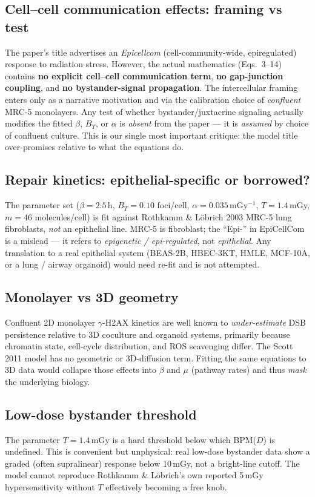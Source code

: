 \documentclass[11pt]{article}
\begin{document}
\subsection{Cell--cell communication effects: framing vs test}
The paper's title advertises an \emph{Epicellcom} (cell-community-wide,
epiregulated) response to radiation stress. However, the actual mathematics
(Eqs.~3--14) contains \textbf{no explicit cell--cell communication term},
\textbf{no gap-junction coupling}, and \textbf{no bystander-signal
propagation}. The intercellular framing enters only as a narrative motivation
and via the calibration choice of \emph{confluent} MRC-5 monolayers. Any test
of whether bystander/juxtacrine signaling actually modifies the fitted
$\beta$, $B_T$, or $\alpha$ is \emph{absent} from the paper --- it is
\emph{assumed} by choice of confluent culture. This is our single most
important critique: the model title over-promises relative to what the
equations do.

\subsection{Repair kinetics: epithelial-specific or borrowed?}
The parameter set ($\beta = 2.5$\,h, $B_T = 0.10$ foci/cell, $\alpha =
0.035$\,mGy$^{-1}$, $T = 1.4$\,mGy, $m = 46$ molecules/cell) is fit against
Rothkamm \& L\"obrich 2003 MRC-5 lung fibroblasts, \emph{not} an epithelial
line. MRC-5 is fibroblast; the ``Epi-'' in EpiCellCom is a mislead --- it
refers to \emph{epigenetic / epi-regulated}, not \emph{epithelial}. Any
translation to a real epithelial system (BEAS-2B, HBEC-3KT, HMLE, MCF-10A,
or a lung / airway organoid) would need re-fit and is not attempted.

\subsection{Monolayer vs 3D geometry}
Confluent 2D monolayer $\gamma$-H2AX kinetics are well known to
\emph{under-estimate} DSB persistence relative to 3D coculture and organoid
systems, primarily because chromatin state, cell-cycle distribution, and
ROS scavenging differ. The Scott 2011 model has no geometric or 3D-diffusion
term. Fitting the same equations to 3D data would collapse those effects into
$\beta$ and $\mu$ (pathway rates) and thus \emph{mask} the underlying biology.

\subsection{Low-dose bystander threshold}
The parameter $T = 1.4$\,mGy is a hard threshold below which BPM($D$) is
undefined. This is convenient but unphysical: real low-dose bystander data
show a graded (often supralinear) response below 10\,mGy, not a bright-line
cutoff. The model cannot reproduce Rothkamm \& L\"obrich's own reported
5\,mGy hypersensitivity without $T$ effectively becoming a free knob.
\end{document}

